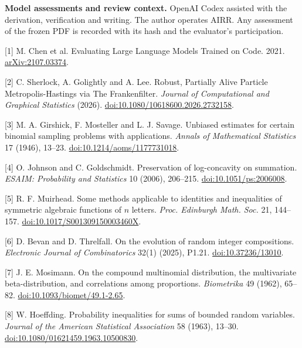 \documentclass[11pt]{article}
\begin{document}


\textbf{Model assessments and review context.} OpenAI Codex assisted with the derivation, verification and writing. The author operates AIRR. Any assessment of the frozen PDF is recorded with its hash and the evaluator's participation.

\small
[1] M. Chen et al. Evaluating Large Language Models Trained on Code. 2021. \href{https://arxiv.org/abs/2107.03374}{arXiv:2107.03374}.

[2] C. Sherlock, A. Golightly and A. Lee. Robust, Partially Alive Particle Metropolis-Hastings via The Frankenfilter. \emph{Journal of Computational and Graphical Statistics} (2026). \href{https://doi.org/10.1080/10618600.2026.2732158}{doi:10.1080/10618600.2026.2732158}.

[3] M. A. Girshick, F. Mosteller and L. J. Savage. Unbiased estimates for certain binomial sampling problems with applications. \emph{Annals of Mathematical Statistics} 17 (1946), 13--23. \href{https://doi.org/10.1214/aoms/1177731018}{doi:10.1214/aoms/1177731018}.

[4] O. Johnson and C. Goldschmidt. Preservation of log-concavity on summation. \emph{ESAIM: Probability and Statistics} 10 (2006), 206--215. \href{https://doi.org/10.1051/ps:2006008}{doi:10.1051/ps:2006008}.

[5] R. F. Muirhead. Some methods applicable to identities and inequalities of symmetric algebraic functions of $n$ letters. \emph{Proc. Edinburgh Math. Soc.} 21, 144--157. \href{https://doi.org/10.1017/S001309150003460X}{doi:10.1017/S001309150003460X}.

[6] D. Bevan and D. Threlfall. On the evolution of random integer compositions. \emph{Electronic Journal of Combinatorics} 32(1) (2025), P1.21. \href{https://doi.org/10.37236/13010}{doi:10.37236/13010}.

[7] J. E. Mosimann. On the compound multinomial distribution, the multivariate beta-distribution, and correlations among proportions. \emph{Biometrika} 49 (1962), 65--82. \href{https://doi.org/10.1093/biomet/49.1-2.65}{doi:10.1093/biomet/49.1-2.65}.

[8] W. Hoeffding. Probability inequalities for sums of bounded random variables. \emph{Journal of the American Statistical Association} 58 (1963), 13--30. \href{https://doi.org/10.1080/01621459.1963.10500830}{doi:10.1080/01621459.1963.10500830}.
\end{document}
